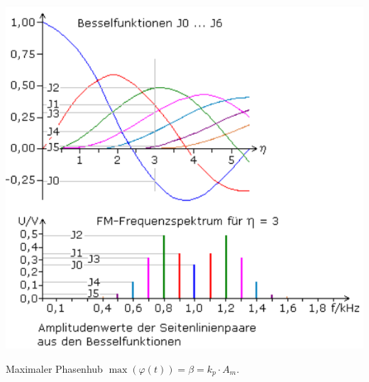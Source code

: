 \begin{center}
	\includegraphics[width=0.8\columnwidth]{Images/besselfunktion}
\end{center}

Maximaler Phasenhub $\max(\varphi(t)) = \beta = k_p\cdot A_m$.~\\ \\


